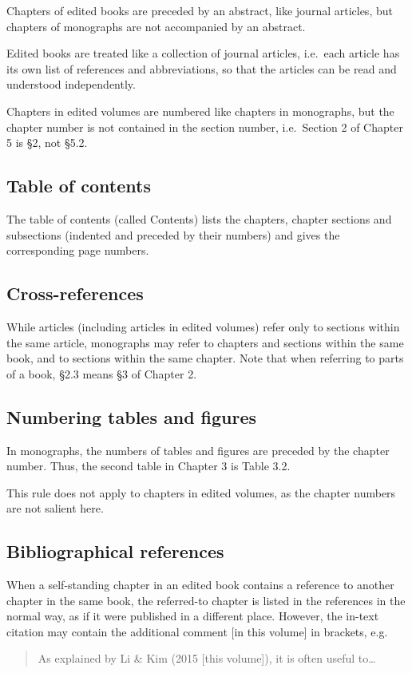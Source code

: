 \documentclass[a4paper]{article}
\newenvironment{gsrexq}{\begin{quote}\color{blue}}{\end{quote}}
\newcommand{\gsrex}[1]{{\color{blue}#1}}
\begin{document}
Chapters of edited books are preceded by an abstract, like journal
articles, but chapters of monographs are not accompanied by an abstract.

Edited books are treated like a collection of journal articles,
i.e.~each article has its own list of references and abbreviations, so
that the articles can be read and understood independently.

Chapters in
edited volumes are numbered like chapters in monographs, but the chapter
number is not contained in the section number, i.e.~Section 2 of Chapter
5 is §2, not §5.2.

\subsection{Table of contents}\label{sec:table-of-contents}

The table of contents (called \gsrex{Contents}) lists the chapters, chapter
sections and subsections (indented and preceded by their numbers) and
gives the corresponding page numbers.

\subsection{Cross-references}\label{sec:cross-references}

While articles (including articles in edited volumes) refer only to
sections within the same article, monographs may refer to chapters and
sections within the same book, and to sections within the same chapter.
Note that when referring to parts of a book, \gsrex{§2.3} means §3 of Chapter 2.

\subsection{Numbering tables and figures}\label{sec:numbering-tables-and-figures}

In monographs, the numbers of tables and figures are preceded by the
chapter number. Thus, the second table in Chapter 3 is \gsrex{Table 3.2}.

This rule does not apply to chapters in edited volumes, as the chapter
numbers are not salient here.

\subsection{Bibliographical references}\label{sec:bibliographical-references}
\largerpage
When a self-standing chapter in an edited book contains a reference to
another chapter in the same book, the referred-to chapter is listed in
the references in the normal way, as if it were published in a different
place. However, the in-text citation may contain the additional comment
\gsrex{[in this volume]} in brackets, e.g.

\begin{gsrexq}
As explained by Li \& Kim (2015 [this volume]), it is often useful to\ldots{} 
\end{gsrexq}
\end{document}

